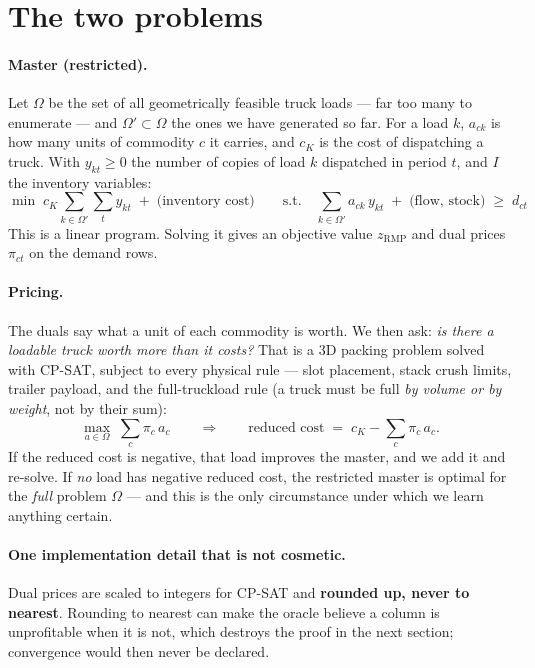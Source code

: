 \documentclass[11pt,a4paper]{article}
\begin{document}
\section{The two problems}

\paragraph{Master (restricted).}
Let $\Omega$ be the set of all geometrically feasible truck loads --- far too
many to enumerate --- and $\Omega' \subset \Omega$ the ones we have generated so
far. For a load $k$, $a_{ck}$ is how many units of commodity $c$ it carries, and
$c_K$ is the cost of dispatching a truck. With $y_{kt} \geq 0$ the number of
copies of load $k$ dispatched in period $t$, and $I$ the inventory variables:
\[
\min \; c_K \sum_{k \in \Omega'} \sum_t y_{kt} \;+\; \text{(inventory cost)}
\qquad \text{s.t.} \quad
\sum_{k \in \Omega'} a_{ck}\, y_{kt} \;+\; \text{(flow, stock)} \;\geq\; d_{ct}
\]
This is a linear program. Solving it gives an objective value $z_{\mathrm{RMP}}$
and dual prices $\pi_{ct}$ on the demand rows.

\paragraph{Pricing.}
The duals say what a unit of each commodity is worth. We then ask: \emph{is
there a loadable truck worth more than it costs?} That is a 3D packing problem
solved with CP-SAT, subject to every physical rule --- slot placement, stack
crush limits, trailer payload, and the full-truckload rule (a truck must be full
\emph{by volume or by weight}, not by their sum):
\[
\max_{a \in \Omega} \; \sum_c \pi_c\, a_c
\qquad\Longrightarrow\qquad
\text{reduced cost} \;=\; c_K - \sum_c \pi_c\, a_c .
\]
If the reduced cost is negative, that load improves the master, and we add it
and re-solve. If \emph{no} load has negative reduced cost, the restricted master
is optimal for the \emph{full} problem $\Omega$ --- and this is the only
circumstance under which we learn anything certain.

\paragraph{One implementation detail that is not cosmetic.}
Dual prices are scaled to integers for CP-SAT and \textbf{rounded up, never to
nearest}. Rounding to nearest can make the oracle believe a column is unprofitable
when it is not, which destroys the proof in the next section; convergence would
then never be declared.
\end{document}
